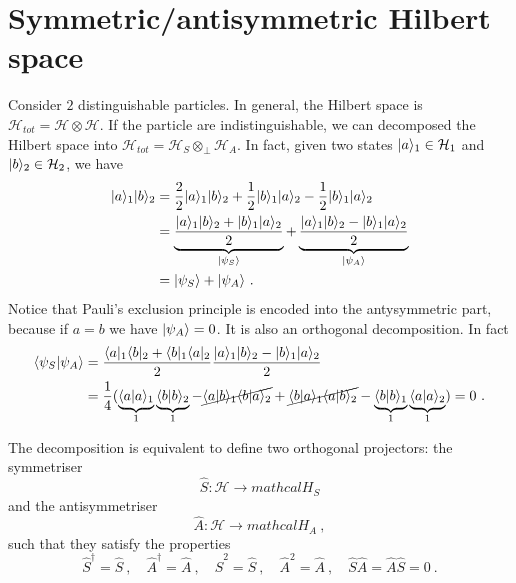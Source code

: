 \section{Symmetric/antisymmetric Hilbert space} 

    Consider $2$ distinguishable particles. In general, the Hilbert space is $\mathcal H_{tot} = \mathcal H \otimes \mathcal H$. If the particle are indistinguishable, we can decomposed the Hilbert space into $\mathcal H_{tot} = \mathcal H_S \otimes_\perp  \mathcal H_A$. In fact, given two states $\vert a\rangle_1 \in \mathcal H_1$ and $\vert b\rangle_2 \in \mathcal H_2$, we have 
    \begin{equation*}
    \begin{aligned}
        \vert a\rangle_1\vert b\rangle_2 & = \frac{2}{2} \vert a\rangle_1\vert b\rangle_2 + \frac{1}{2} \vert b\rangle_1\vert a\rangle_2 - \frac{1}{2} \vert b\rangle_1\vert a\rangle_2 \\ & = \underbrace{\frac{\vert a\rangle_1\vert b\rangle_2 + \vert b\rangle_1\vert a\rangle_2}{2}}_{\vert\psi_S\rangle} + \underbrace{\frac{\vert a\rangle_1\vert b\rangle_2 - \vert b\rangle_1\vert a\rangle_2}{2}}_{\vert\psi_A\rangle} \\ & = \vert\psi_S\rangle + \vert\psi_A\rangle ~.
    \end{aligned}
    \end{equation*}
    Notice that Pauli's exclusion principle is encoded into the antysymmetric part, because if $a = b$ we have $\vert\psi_A\rangle = 0$. It is also an orthogonal decomposition. In fact 
    \begin{equation*}
    \begin{aligned}
        \langle\psi_S\vert\psi_A\rangle & = \frac{\langle a\vert_1\langle b\vert_2 + \langle b\vert_1\langle a\vert_2}{2} \frac{\vert a\rangle_1 \vert b\rangle_2 - \vert b\rangle_1 \vert a\rangle_2}{2} \\ & = \frac{1}{4} (\underbrace{\langle a\vert a\rangle_1}_1 \underbrace{\langle b\vert b\rangle_2}_1 - \cancel{\langle a\vert b\rangle_1 \langle b\vert a\rangle_2} + \cancel{\langle b\vert a\rangle_1 \langle a\vert b\rangle_2} - \underbrace{\langle b\vert b\rangle_1}_1 \underbrace{\langle a\vert a\rangle_2}_1 ) = 0 ~. 
    \end{aligned}
    \end{equation*}

    The decomposition is equivalent to define two orthogonal projectors: the symmetriser 
    \begin{equation*}
        \hat S \colon \mathcal H \rightarrow mathcal H_S
    \end{equation*}
    and the antisymmetriser 
    \begin{equation*}
        \hat A \colon \mathcal H \rightarrow mathcal H_A ~,
    \end{equation*}
    such that they satisfy the properties 
    \begin{equation*}
        \hat S^\dagger = \hat S~, \quad \hat A^\dagger = \hat A~, \quad \hat S^2 = \hat S~, \quad \hat A^2 = \hat A~, \quad \hat S \hat A = \hat A \hat S = 0 ~.
    \end{equation*}

